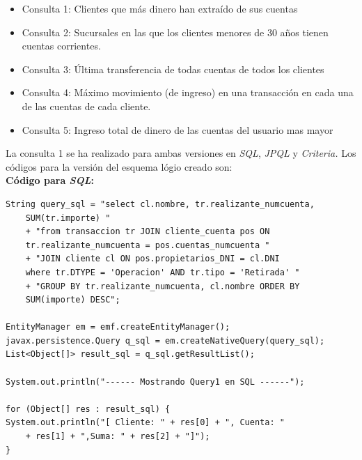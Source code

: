 \documentclass[11pt,a4paper]{article}
\begin{document}
\begin{itemize}
\item Consulta 1: Clientes que más dinero han extraído de sus cuentas
\item Consulta 2: Sucursales en las que los clientes menores de 30 años tienen cuentas corrientes.
\item Consulta 3: Última transferencia de todas cuentas de todos los clientes
\item Consulta 4: Máximo movimiento (de ingreso) en una transacción en cada una de las cuentas de cada cliente.
\item Consulta 5: Ingreso total de dinero de las cuentas del usuario mas mayor
\end{itemize}

La consulta 1 se ha realizado para ambas versiones en \textit{SQL}, \textit{JPQL} y \textit{Criteria.}
Los códigos para la versión del esquema lógio creado son:\\
\textbf{Código para \textit{SQL}:}
\begin{lstlisting}
String query_sql = "select cl.nombre, tr.realizante_numcuenta,
    SUM(tr.importe) "
	+ "from transaccion tr JOIN cliente_cuenta pos ON 
	tr.realizante_numcuenta = pos.cuentas_numcuenta "
	+ "JOIN cliente cl ON pos.propietarios_DNI = cl.DNI 
	where tr.DTYPE = 'Operacion' AND tr.tipo = 'Retirada' "
	+ "GROUP BY tr.realizante_numcuenta, cl.nombre ORDER BY 
	SUM(importe) DESC";

EntityManager em = emf.createEntityManager();
javax.persistence.Query q_sql = em.createNativeQuery(query_sql);
List<Object[]> result_sql = q_sql.getResultList();

System.out.println("------ Mostrando Query1 en SQL ------");

for (Object[] res : result_sql) {
System.out.println("[ Cliente: " + res[0] + ", Cuenta: " 
	+ res[1] + ",Suma: " + res[2] + "]");
}
\end{lstlisting}
\end{document}
